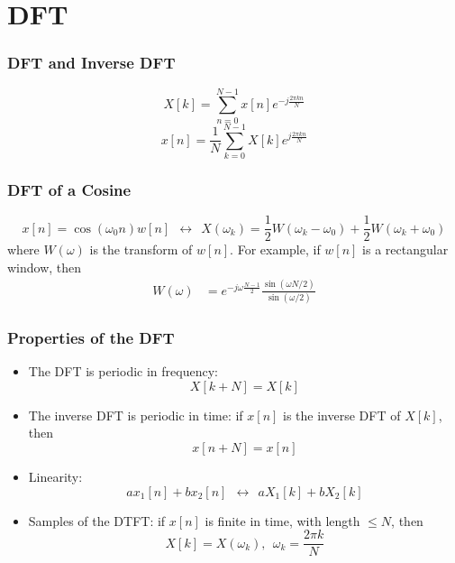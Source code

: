 \documentclass{beamer}
\begin{document}
\section[DFT]{DFT}
\setcounter{subsection}{1}

\begin{frame}
  \frametitle{DFT and Inverse DFT}

  \begin{displaymath}
    X[k] = \sum_{n=0}^{N-1} x[n]e^{-j\frac{2\pi kn}{N}}
  \end{displaymath}
  \begin{displaymath}
    x[n] = \frac{1}{N}\sum_{k=0}^{N-1} X[k]e^{j\frac{2\pi kn}{N}}
  \end{displaymath}
\end{frame}

\begin{frame}
  \frametitle{DFT of a Cosine}

  \begin{displaymath}
    x[n]=\cos(\omega_0 n)w[n] ~~\leftrightarrow~~
    X(\omega_k)=\frac{1}{2}W(\omega_k-\omega_0) + \frac{1}{2}W(\omega_k+\omega_0)
  \end{displaymath}
  where $W(\omega)$ is the transform of $w[n]$.  For example, if
  $w[n]$ is a rectangular window, then
  \begin{align*}
    W(\omega) &= e^{-j\omega\frac{N-1}{2}}\frac{\sin(\omega N/2)}{\sin(\omega/2)}
  \end{align*}
\end{frame}

\begin{frame}
  \frametitle{Properties of the DFT}

  \begin{itemize}
  \item The DFT is periodic in frequency:
    \[ X[k+N] = X[k] \]
  \item The inverse DFT is periodic in time:
    if $x[n]$ is the inverse DFT of $X[k]$, then
    \[ x[n+N] = x[n] \]
  \item Linearity:
    \begin{displaymath}
      ax_1[n]+bx_2[n] ~~\leftrightarrow~~aX_1[k]+bX_2[k]
    \end{displaymath}
  \item Samples of the DTFT: if $x[n]$ is finite in time, with length $\le N$, then
    \begin{displaymath}
      X[k] = X(\omega_k),~~\omega_k = \frac{2\pi k}{N}
    \end{displaymath}
  \end{itemize}
\end{frame}  
\end{document}
